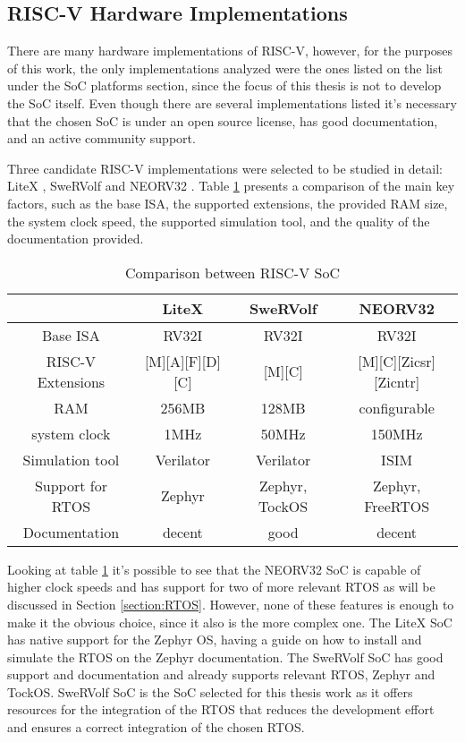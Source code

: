 \subsection{RISC-V Hardware Implementations}
There are many hardware implementations of RISC-V, however, for the purposes of this work, the only implementations analyzed were the ones listed on the list \cite{RISCV_list} under the SoC platforms section, since the focus of this thesis is not to develop the SoC itself. Even though there are several implementations listed it's necessary that the chosen SoC is under an open source license, has good documentation, and an active community support.

Three candidate RISC-V implementations were selected to be studied in detail: LiteX \cite{LiteX}, SweRVolf \cite{SweRVolf} and NEORV32 \cite{NEORV32}. Table \ref{tab:comparação RISC} presents a comparison of the main key factors, such as the base ISA, the supported extensions, the provided RAM size, the system clock speed, the supported simulation tool, and the quality of the documentation provided.

\begin{table}[H]
    \centering
    \begin{tabular}{ c | c | c | c }
         & LiteX & SweRVolf & NEORV32\\
        \hline
        Base ISA & RV32I & RV32I & RV32I\\
        RISC-V Extensions & [M][A][F][D][C] & [M][C] & [M][C][Zicsr][Zicntr]\\ 
        \hline
        RAM & 256MB & 128MB & configurable\\
        system clock & 1MHz & 50MHz & 150MHz\\
        \hline
        Simulation tool & Verilator & Verilator & ISIM\\
        \hline
        Support for RTOS & Zephyr & Zephyr, TockOS & Zephyr, FreeRTOS\\
        \hline
        Documentation & decent & good & decent\\
    \end{tabular}
    \label{tab:comparação RISC}
    \caption{Comparison between RISC-V SoC}
\end{table}

Looking at table \ref{tab:comparação RISC} it's possible to see that the NEORV32 SoC is capable of higher clock speeds and has support for two of more relevant RTOS as will be discussed in Section \ref{section:RTOS}. However, none of these features is enough to make it the obvious choice, since it also is the more complex one. The LiteX SoC has native support for the Zephyr OS, having a guide on how to install and simulate the RTOS on the Zephyr documentation. The SweRVolf SoC has good support and documentation and already supports relevant RTOS, Zephyr and TockOS. SweRVolf SoC is the SoC selected for this thesis work as it offers resources for the integration of the RTOS that reduces the development effort and ensures a correct integration of the chosen RTOS.

